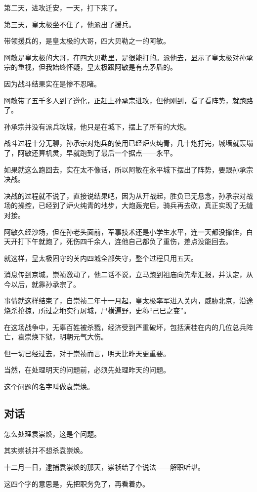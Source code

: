 \begin{multicols}{\theparacolNo}
		第二天，进攻迁安，一天，打下来了。

		第三天，皇太极坐不住了，他派出了援兵。

		带领援兵的，是皇太极的大哥，四大贝勒之一的阿敏。

		阿敏是皇太极的大哥，在四大贝勒里，是很能打的。派他去，显示了皇太极对孙承宗的重视，但我始终怀疑，皇太极跟阿敏是有点矛盾的。

		因为战斗结果实在是惨不忍睹。

		阿敏带了五千多人到了遵化，正赶上孙承宗进攻，但他刚到，看了看阵势，就跑路了。

		孙承宗并没有派兵攻城，他只是在城下，摆上了所有的大炮。

		战斗过程十分无聊，孙承宗对炮兵的使用已经炉火纯青，几十炮打完，城墙就轰塌了，阿敏还算机灵，早就跑到了最后一个据点——永平。

		如果就这么跑回去，实在太不像话，所以阿敏在永平城下摆出了阵势，要跟孙承宗决战。

		决战的过程就不说了，直接说结果吧，因为从开战起，胜负已无悬念，孙承宗对战场的操控，已经到了炉火纯青的地步，大炮轰完后，骑兵再去砍，真正实现了无缝对接。

		阿敏久经沙场，但在孙老头面前，军事技术还是小学生水平，连一天都没撑住，白天开打下午就跑了，死伤四千余人，连他自己都负了重伤，差点没能回去。

		就这样，皇太极固守的关内四城全部失守，整个过程只用五天。

		消息传到京城，崇祯激动了，他二话不说，立马跑到祖庙向先辈汇报，并认定，从今以后，就靠孙承宗了。

		事情就这样结束了，自崇祯二年十一月起，皇太极率军进入关内，威胁北京，沿途烧杀抢掠，所过之地实行屠城，尸横遍野，史称“己巳之变”。

		在这场战争中，无辜百姓被杀戮，经济受到严重破坏，包括满桂在内的几位总兵阵亡，袁崇焕下狱，明朝元气大伤。

		但一切已经过去，对于崇祯而言，明天比昨天更重要。

		当然，在处理明天的问题前，必须先处理昨天的问题。

		这个问题的名字叫做袁崇焕。

		\subsection{对话}
		怎么处理袁崇焕，这是个问题。

		其实崇祯并不想杀袁崇焕。

		十二月一日，逮捕袁崇焕的那天，崇祯给了个说法——解职听堪。

		这四个字的意思是，先把职务免了，再看着办。


\end{multicols}
